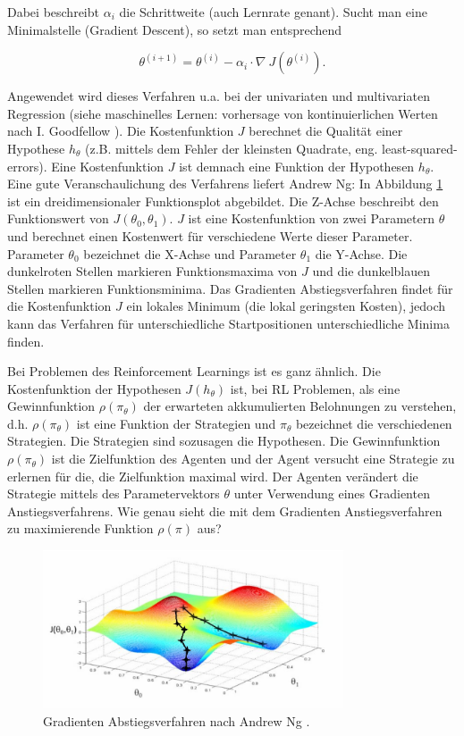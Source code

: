 \documentclass[conference]{IEEEtran}
\begin{document}
Dabei beschreibt $\alpha_i$ die Schrittweite (auch Lernrate genant). Sucht man eine Minimalstelle (Gradient Descent), so setzt man entsprechend 

\begin{equation*}
\theta^{(i+1)} = \theta^{(i)} - \alpha_i \cdot \nabla \: J(\theta^{(i)}).
\end{equation*}

Angewendet wird dieses Verfahren u.a. bei der univariaten und multivariaten Regression (siehe maschinelles Lernen: vorhersage von kontinuierlichen Werten nach I. Goodfellow \cite{goodfellow_16}). Die Kostenfunktion $J$ berechnet die Qualität einer Hypothese $h_\theta$ (z.B. mittels dem Fehler der kleinsten Quadrate, eng. least-squared-errors). Eine Kostenfunktion $J$ ist demnach eine Funktion der Hypothesen $h_\theta$. Eine gute Veranschaulichung des Verfahrens liefert Andrew Ng: In Abbildung \ref{fig:gradient_descent} ist ein dreidimensionaler Funktionsplot abgebildet. Die Z-Achse beschreibt den Funktionswert von $J(\theta_0, \theta_1)$. $J$ ist eine Kostenfunktion von zwei Parametern $\theta$ und berechnet einen Kostenwert für verschiedene Werte dieser Parameter. Parameter $\theta_0$ bezeichnet die X-Achse und Parameter $\theta_1$ die Y-Achse. Die dunkelroten Stellen markieren Funktionsmaxima von $J$ und die dunkelblauen Stellen markieren Funktionsminima. Das Gradienten Abstiegsverfahren findet für die Kostenfunktion $J$ ein lokales Minimum (die lokal geringsten Kosten), jedoch kann das Verfahren für unterschiedliche Startpositionen unterschiedliche Minima finden. 

Bei Problemen des Reinforcement Learnings ist es ganz ähnlich. Die Kostenfunktion der Hypothesen $J(h_\theta)$ ist, bei RL Problemen, als eine Gewinnfunktion $\rho(\pi_\theta)$ der erwarteten akkumulierten Belohnungen zu verstehen, d.h. $\rho(\pi_\theta)$ ist eine Funktion der Strategien und $\pi_\theta$ bezeichnet die verschiedenen Strategien. Die Strategien sind sozusagen die Hypothesen. Die Gewinnfunktion $\rho(\pi_\theta)$ ist die Zielfunktion des Agenten und der Agent versucht eine Strategie zu erlernen für die, die Zielfunktion maximal wird. Der Agenten verändert die Strategie mittels des Parametervektors $\theta$ unter Verwendung eines Gradienten Anstiegsverfahrens. Wie genau sieht die mit dem Gradienten Anstiegsverfahren zu maximierende Funktion $\rho(\pi)$ aus?

\begin{figure}[!t]
\centering
\includegraphics[width=3.5in]{gradient_descent}
\caption{Gradienten Abstiegsverfahren nach Andrew Ng \cite{andrew_ng_17}.}
\label{fig:gradient_descent}
\end{figure}
\end{document}
